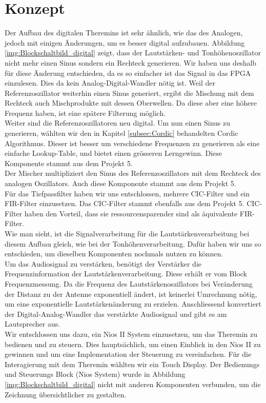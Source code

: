 
\clearpage
\section{Konzept}\label{sec:Konzept}
Der Aufbau des digitalen Theremins ist sehr ähnlich, wie das des Analogen, jedoch mit einigen Änderungen, um es besser digital aufzubauen. Abbildung \ref{img:Blockschaltbild_digital} zeigt, dass der Lautstärken- und Tonhöhenoszillator nicht mehr einen Sinus sondern ein Rechteck generieren. Wir haben uns deshalb für diese Änderung entschieden, da es so einfacher ist das Signal in das FPGA einzulesen. Dies da kein Analog-Digital-Wandler nötig ist. Weil der Referenzoszillator weiterhin einen Sinus generiert, ergibt die Mischung mit dem Rechteck auch Mischprodukte mit dessen Oberwellen. Da diese aber eine höhere Frequenz haben, ist eine spätere Filterung möglich.\\
Weiter sind die Referenzoszillatoren neu digital. Um nun einen Sinus zu generieren, wählten wir den in Kapitel \ref{subsec:Cordic} behandelten Cordic Algorithmus. Dieser ist besser um verschiedene Frequenzen zu generieren als eine einfache Lookup-Table, und bietet einen grösseren Lerngewinn. Diese Komponente stammt aus dem Projekt 5. \\
Der Mischer multipliziert den Sinus des Referenzoszillators mit dem Rechteck des analogen Oszillators. Auch diese Komponente stammt aus dem Projekt 5.\\
Für das Tiefpassfilter haben wir uns entschlossen, mehrere CIC-Filter und ein FIR-Filter einzusetzen. Das CIC-Filter stammt ebenfalls aus dem Projekt 5. CIC-Filter haben den Vorteil, dass sie ressourcensparender sind als äquivalente FIR-Filter.\\
Wie man sieht, ist die Signalverarbeitung für die Lautstärkenverarbeitung bei diesem Aufbau gleich, wie bei der Tonhöhenverarbeitung. Dafür haben wir uns so entschieden, um dieselben Komponenten nochmals nutzen zu können.\\
Um das Audiosignal zu verstärken, benötigt der Verstärker die Frequenzinformation der Lautstärkenverarbeitung. Diese erhält er vom Block Frequenzmessung. Da die Frequenz des Lautstärkenoszillators bei Veränderung der Distanz zu der Antenne exponentiell ändert, ist keinerlei Umrechnung nötig, um eine exponentielle Lautstärkenänderung zu erzielen.
Anschliessend konvertiert der Digital-Analog-Wandler das verstärkte Audiosignal und gibt es am Lautsprecher aus.\\
Wir entschlossen uns dazu, ein Nios II System einzusetzen, um das Theremin zu bedienen und zu steuern. Dies hauptsächlich, um einen Einblick in den Nios II zu gewinnen und um eine Implementation der Steuerung zu vereinfachen. Für die Interagierung mit dem Theremin wählten wir ein Touch Display. Der Bedienungs und Steuerungs Block (Nios System) wurde in Abbildung \ref{img:Blockschaltbild_digital} nicht mit anderen Komponenten verbunden, um die Zeichnung übersichtlicher zu gestalten.

